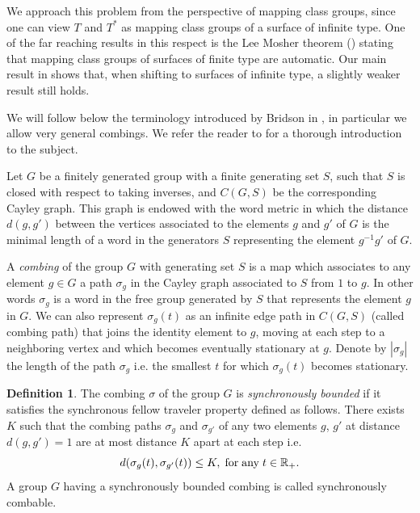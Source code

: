 \documentclass[twoside]{irmaems}
\theoremstyle{plain}
\theoremstyle{definition}
\newtheorem{definition}{Definition}[section]
\theoremstyle{remark}
\newcommand{\R}{{\mathbb{R}}}
\begin{document}
 
\vspace{0.2cm}
\noindent 
We approach this problem from the 
perspective of mapping class groups, since one can view $T$ and $T^*$ as 
mapping class groups of a surface of infinite type. One of the far reaching 
results in this respect is the Lee Mosher theorem  (\cite{Mo}) stating that 
mapping class  groups of surfaces of finite type are automatic. 
Our main result in 
\cite{fu-ka4} shows that, when shifting to surfaces of infinite type, a slightly 
weaker result still holds.  


\vspace{0.2cm}
\noindent 
We will follow below the terminology introduced by Bridson in \cite{A,Br,Br2},
in particular we allow very general combings. We refer  the reader 
to \cite{ECHLPT} for a thorough introduction to the subject. 

\vspace{0.2cm}
\noindent 
Let $G$ be a finitely generated group with a finite generating set 
$S$, such that $S$ is closed with respect to taking inverses,  
and  $C(G,S)$ be the corresponding Cayley graph. This graph is endowed with 
the word metric in which the distance $d(g,g')$ between the vertices 
associated 
to the elements $g$ and $g'$ of $G$ is the minimal length of a word 
in the generators $S$  representing  the 
element $g^{-1}g'$ of $G$. 

\vspace{0.2cm}
\noindent 
A {\em combing}  of the group $G$ with generating set $S$ 
is a map which associates to any element $g\in G$ a 
path $\sigma_{g}$ in the Cayley graph associated to $S$
from $1$ to $g$. In other words $\sigma_{g}$ is a word in the 
free group generated by $S$ that represents  the 
element $g$ in $G$.  We can also represent $\sigma_g(t)$ as an infinite 
edge path in $C(G,S)$ (called  
combing path)  that joins the identity element to $g$, moving 
at each step to a neighboring vertex and which becomes eventually 
stationary at $g$. Denote by $|\sigma_g|$ the length of the path $\sigma_g$ 
i.e. the smallest $t$ for which $\sigma_g(t)$ becomes stationary.  


\begin{definition}
The combing $\sigma$ of the group $G$ is {\em synchronously bounded}
 if it 
satisfies the synchronous fellow traveler property defined as follows. 
There exists $K$ such that the combing paths $\sigma_g$ and 
$\sigma_{g'}$ of  any two elements $g$, $g'$ at distance $d(g,g')=1$ 
are at most distance $K$ apart at each step i.e. 
\[ d(\sigma_g(t),\sigma_{g'}(t))\leq K, \; {\rm for \; any }\; t\in \R_+.\]
A group  $G$ having a synchronously bounded combing is  called synchronously
combable. 
\end{definition}
\end{document}

